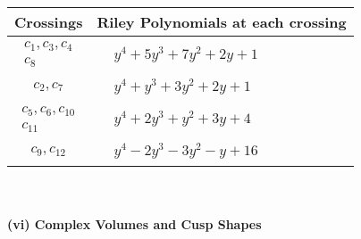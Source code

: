 \documentclass[1p]{elsarticle_modified}
\theoremstyle{definition}
\begin{document}
\begin{tabular}{m{50pt}|m{274pt}}
Crossings & \hspace{64pt}Riley Polynomials at each crossing \\
\hline $$\begin{aligned}c_{1},c_{3},c_{4}\\c_{8}\end{aligned}$$&$\begin{aligned}
&y^4+5 y^3+7 y^2+2 y+1
\end{aligned}$\\
\hline $$\begin{aligned}c_{2},c_{7}\end{aligned}$$&$\begin{aligned}
&y^4+y^3+3 y^2+2 y+1
\end{aligned}$\\
\hline $$\begin{aligned}c_{5},c_{6},c_{10}\\c_{11}\end{aligned}$$&$\begin{aligned}
&y^4+2 y^3+y^2+3 y+4
\end{aligned}$\\
\hline $$\begin{aligned}c_{9},c_{12}\end{aligned}$$&$\begin{aligned}
&y^4-2 y^3-3 y^2- y+16
\end{aligned}$\\
\hline
\end{tabular}\\~\\
\newpage\flushleft \textbf{(vi) Complex Volumes and Cusp Shapes}
\end{document}
